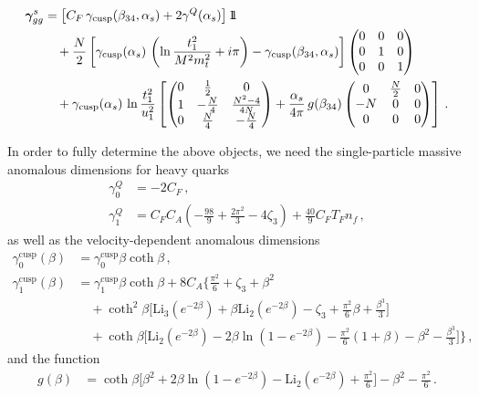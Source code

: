 \documentclass[a4paper,11pt]{article}
\newcommand{\unitop}{{\boldmath{1\!\!1}}}
\newcommand{\bfgamma}{\bm{\gamma}}
\newcommand{\Litwo}{{\text{Li}_2}}
\newcommand{\Lithree}{{\text{Li}_3}}
\numberwithin{equation}{section}
\begin{document}
\begin{align}
  \bfgamma^s_{gg} &= \left[
  C_F \,
  \gamma_{\text{cusp}}(\beta_{34},\alpha_s) +
  2\gamma^Q(\alpha_s)
  \right] \unitop \nonumber
  \\
  &\quad\mbox{} + \frac{N}{2} \left[ \gamma_{\text{cusp}}(\alpha_s) \, \left(
  \ln\frac{t_1^2}{M^2m_t^2} + i\pi\right) -
  \gamma_{\text{cusp}}(\beta_{34},\alpha_s) \right]
  \begin{pmatrix}
    0 & 0 & 0
    \\
    0 & 1 & 0
    \\
    0 & 0 & 1
  \end{pmatrix}
  \nonumber
  \\
  &\quad\mbox{} + \gamma_{\text{cusp}}(\alpha_s) \, \ln\frac{t_1^2}{u_1^2}
  \left[ \begin{pmatrix}
  0 & \frac{1}{2} & 0
  \\
  1 & -\frac{N}{4} & \frac{N^2-4}{4N}
  \\
  0 & \frac{N}{4} & -\frac{N}{4}
  \end{pmatrix} 
  + \frac{\alpha_s}{4\pi}\,g(\beta_{34})
  \begin{pmatrix}
  0 & \frac{N}{2} & 0
  \\
  -N & 0 & 0 \\
  0 & 0 & 0
    \end{pmatrix}
  \right]\,.
\end{align}

In order to fully determine the above objects, we need the single-particle
massive anomalous dimensions for heavy quarks~\cite{Becher:2009qa,
Becher:2009kw}
%
\begin{align}
  \gamma^Q_0 &= - 2 C_F \, ,
  \nonumber
  \\
  \gamma^Q_1 &= C_F C_A \left( -\frac{98}{9} + \frac{2\pi^2}{3} - 4 \zeta_3 \right) +
  \frac{40}{9} C_F T_F n_f \, ,
\end{align}
%
as well as the velocity-dependent anomalous dimensions~\cite{Becher:2009kw,
Ferroglia:2009ep, Ferroglia:2009ii, Korchemsky:1987wg, Korchemsky:1991zp,
Kidonakis:2009ev}
%
\begin{align}
  \label{eq:vel-dep-ad}
  \gamma^{\text{cusp}}_0(\beta) &= \gamma^{\text{cusp}}_0 \beta \coth \beta
  \, ,
  \nonumber
  \\
  \gamma^{\text{cusp}}_1(\beta) &= \gamma^{\text{cusp}}_1 \beta \coth \beta
  + 8 C_A \Bigg\{ \frac{\pi^2}{6} + \zeta_3 + \beta^2 \nonumber
  \\
  &\quad + \coth^2\beta \bigg[ \Lithree(e^{-2\beta}) + \beta
  \Litwo(e^{-2\beta}) - \zeta_3 + \frac{\pi^2}{6} \beta + \frac{\beta^3}{3}
  \bigg]
  \nonumber
  \\
  &\quad + \coth\beta \bigg[ \Litwo(e^{-2\beta}) - 2\beta
  \ln(1-e^{-2\beta}) - \frac{\pi^2}{6} (1+\beta) - \beta^2 -
  \frac{\beta^3}{3} \bigg] \Bigg\} \,,
\end{align}
%
and the function
%
\begin{align}
  \label{eq:gfunc}
  g(\beta) &= \coth\beta \bigg[ \beta^2 + 2\beta
  \ln(1-e^{-2\beta}) - \Litwo(e^{-2\beta}) + \frac{\pi^2}{6} \bigg] -
  \beta^2 - \frac{\pi^2}{6} \, .
\end{align}
\end{document}
